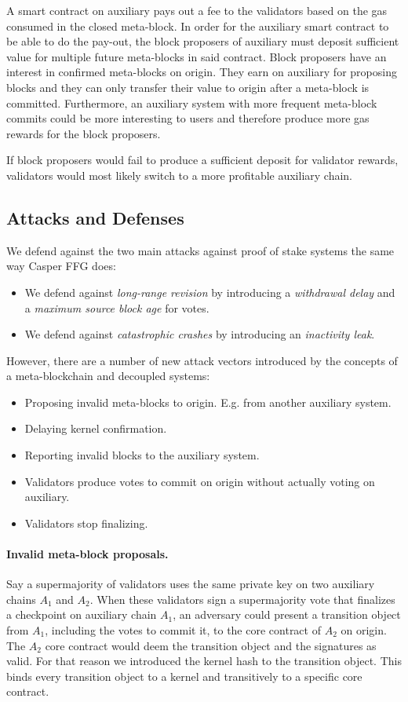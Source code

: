 \documentclass[12pt,a4paper]{article}
\begin{document}
A smart contract on auxiliary pays out a fee to the validators based on the gas consumed in the closed meta-block.
In order for the auxiliary smart contract to be able to do the pay-out, the block proposers of auxiliary must deposit sufficient value for multiple future meta-blocks in said contract.
Block proposers have an interest in confirmed meta-blocks on origin.
They earn on auxiliary for proposing blocks and they can only transfer their value to origin after a meta-block is committed.
Furthermore, an auxiliary system with more frequent meta-block commits could be more interesting to users and therefore produce more gas rewards for the block proposers.

If block proposers would fail to produce a sufficient deposit for validator rewards, validators would most likely switch to a more profitable auxiliary chain.

\subsection{Attacks and Defenses}

We defend against the two main attacks against proof of stake systems the same way Casper FFG\cite{casperffg} does:
\begin{itemize}
    \item We defend against \emph{long-range revision} by introducing a \emph{withdrawal delay} and a \emph{maximum source block age} for votes.
    \item We defend against \emph{catastrophic crashes} by introducing an \emph{inactivity leak}.
\end{itemize}
However, there are a number of new attack vectors introduced by the concepts of a meta-blockchain and decoupled systems:
\begin{itemize}
    \item Proposing invalid meta-blocks to origin. E.g. from another auxiliary system.
    \item Delaying kernel confirmation.
    \item Reporting invalid blocks to the auxiliary system.
    \item Validators produce votes to commit on origin without actually voting on auxiliary.
    \item Validators stop finalizing.
\end{itemize}

\paragraph{Invalid meta-block proposals.}
Say a supermajority of validators uses the same private key on two auxiliary chains $A_1$ and $A_2$.
When these validators sign a supermajority vote that finalizes a checkpoint on auxiliary chain $A_1$, an adversary could present a transition object from $A_1$, including the votes to commit it, to the core contract of $A_2$ on origin.
The $A_2$ core contract would deem the transition object and the signatures as valid.
For that reason we introduced the kernel hash to the transition object.
This binds every transition object to a kernel and transitively to a specific core contract.
\end{document}

